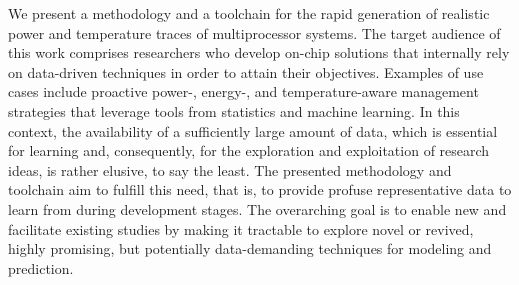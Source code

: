 We present a methodology and a toolchain for the rapid generation of realistic
power and temperature traces of multiprocessor systems. The target audience of
this work comprises researchers who develop on-chip solutions that internally
rely on data-driven techniques in order to attain their objectives. Examples of
use cases include proactive power-, energy-, and temperature-aware management
strategies that leverage tools from statistics and machine learning. In
this context, the availability of a sufficiently large amount of data, which is
essential for learning and, consequently, for the exploration and exploitation
of research ideas, is rather elusive, to say the least. The presented
methodology and toolchain aim to fulfill this need, that is, to provide profuse
representative data to learn from during development stages. The overarching
goal is to enable new and facilitate existing studies by making it tractable to
explore novel or revived, highly promising, but potentially data-demanding
techniques for modeling and prediction.
